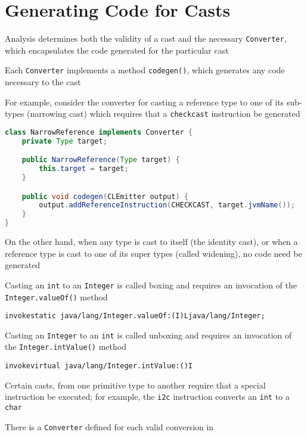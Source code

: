 \documentclass[8pt,a4paper,compress]{beamer}
\begin{document}
\section{Generating Code for Casts}
\begin{frame}[fragile]
\pause

Analysis determines both the validity of a cast and the necessary \lstinline{Converter}, which encapsulates the code generated for the particular cast

\pause
\bigskip

Each \lstinline{Converter} implements a method \lstinline{codegen()}, which generates any code necessary to the cast

\pause
\bigskip

For example, consider the converter for casting a reference type to one of its sub-types (narrowing cast) which requires that a \lstinline{checkcast} instruction be generated
\begin{lstlisting}[language=Java]
class NarrowReference implements Converter {
    private Type target;

    public NarrowReference(Type target) {
        this.target = target;
    }

    public void codegen(CLEmitter output) {
        output.addReferenceInstruction(CHECKCAST, target.jvmName());
    }
}
\end{lstlisting}

\pause
\bigskip

On the other hand, when any type is cast to itself (the identity cast), or when a reference type is cast to one of its super types (called widening), no code need be generated
\end{frame}

\begin{frame}[fragile]
\pause

Casting an \lstinline{int} to an \lstinline{Integer} is called boxing and requires an invocation of the \lstinline{Integer.valueOf()} method

\begin{lstlisting}[language={}]
invokestatic java/lang/Integer.valueOf:(I)Ljava/lang/Integer;
\end{lstlisting}

\pause
\bigskip

Casting an \lstinline{Integer} to an \lstinline{int} is called unboxing and requires an invocation of the \lstinline{Integer.intValue()} method

\begin{lstlisting}[language={}]
invokevirtual java/lang/Integer.intValue:()I
\end{lstlisting}

\pause
\bigskip

Certain casts, from one primitive type to another require that a special instruction be executed; for example, the \lstinline{i2c} instruction converts an \lstinline{int} to a \lstinline{char}

\pause
\bigskip

There is a \lstinline{Converter} defined for each valid conversion in \jmm
\end{frame}
\end{document}
